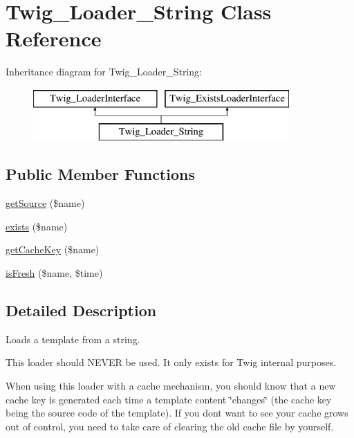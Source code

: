 \hypertarget{class_twig___loader___string}{}\section{Twig\+\_\+\+Loader\+\_\+\+String Class Reference}
\label{class_twig___loader___string}
Inheritance diagram for Twig\+\_\+\+Loader\+\_\+\+String\+:\begin{figure}[H]
\begin{center}
\leavevmode
\includegraphics[height=2.000000cm]{class_twig___loader___string}
\end{center}
\end{figure}
\subsection*{Public Member Functions}
\begin{DoxyCompactItemize}
\item 
\hyperlink{class_twig___loader___string_a8c6017d8ed0800a8d6b201883fcfb4bd}{get\+Source} (\$name)
\item 
\hyperlink{class_twig___loader___string_a0909de156d39accf2e3c52f4bce3765f}{exists} (\$name)
\item 
\hyperlink{class_twig___loader___string_aaf1587bcc7c8f06e87be6ccaf76fb6ea}{get\+Cache\+Key} (\$name)
\item 
\hyperlink{class_twig___loader___string_a3ee0419b212dc4f6f1e8a5a615423ad8}{is\+Fresh} (\$name, \$time)
\end{DoxyCompactItemize}


\subsection{Detailed Description}
Loads a template from a string.

This loader should N\+E\+V\+E\+R be used. It only exists for Twig internal purposes.

When using this loader with a cache mechanism, you should know that a new cache key is generated each time a template content \char`\"{}changes\char`\"{} (the cache key being the source code of the template). If you don\textquotesingle{}t want to see your cache grows out of control, you need to take care of clearing the old cache file by yourself.

